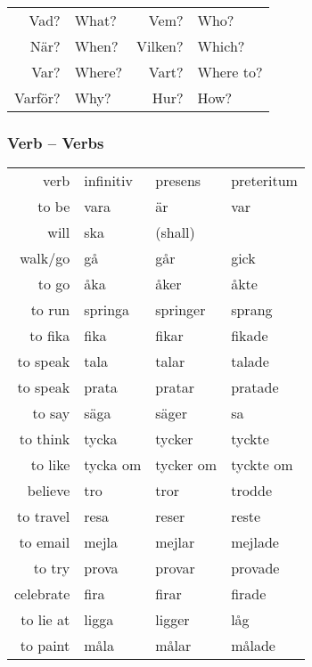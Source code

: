 \documentclass[14pt]{refcard} %
\begin{document}
\begin{tabular}{rl rl}

Vad?       & What?     & Vem?       & Who?      \\
När?       & When?     & Vilken?    & Which?    \\
Var?       & Where?    & Vart?      & Where to? \\
Varför?    & Why?      & Hur?       & How?      \\
\end{tabular}


\subsubsection{Verb -- Verbs}

\begin{tabular}{@{}rlll}
verb      & infinitiv & presens   & preteritum \\[1ex]
to be     & vara      & är        & var        \\
will      & ska       & (shall)   &            \\[1ex]
walk/go   & gå        & går       & gick       \\
to go     & åka       & åker      & åkte       \\
to run    & springa   & springer  & sprang     \\[1ex]
to fika   & fika      & fikar     & fikade     \\[1ex]
to speak  & tala      & talar     & talade     \\
to speak  & prata     & pratar    & pratade    \\
to say    & säga      & säger     & sa         \\[1ex]
to think  & tycka     & tycker    & tyckte     \\
to like   & \footnotesize tycka om  & \footnotesize tycker om & \footnotesize tyckte om  \\
believe   & tro       & tror      & trodde     \\[1ex]
to travel & resa      & reser     & reste      \\
to email  & mejla     & mejlar    & mejlade    \\
to try    & prova     & provar    & provade    \\
celebrate & fira      & firar     & firade     \\
to lie at & ligga     & ligger    & låg        \\
to paint  & måla      & målar     & målade     \\
\end{tabular}
\end{document}
